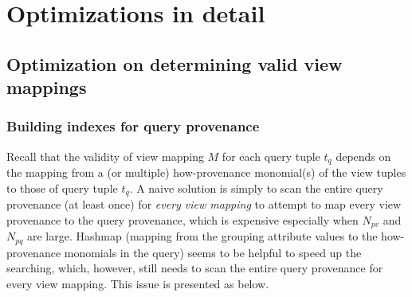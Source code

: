 \section{Optimizations in detail}
\subsection{Optimization on determining valid view mappings}
\subsubsection{Building indexes for query provenance}

Recall that the validity of view mapping $M$ for each query tuple $t_q$ depends on the mapping from a (or multiple) how-provenance monomial(s) of the view tuples to those of query tuple $t_q$. A naive solution is simply to scan the entire query provenance (at least once) for {\em every view mapping} to attempt to map every view provenance to the query provenance, which is expensive especially when $N_{pv}$ and $N_{pq}$ are large. Hashmap (mapping from the grouping attribute values to the how-provenance monomials in the query) seems to be helpful to speed up the searching, which, however, still needs to scan the entire query provenance for every view mapping. This issue is presented as below.

